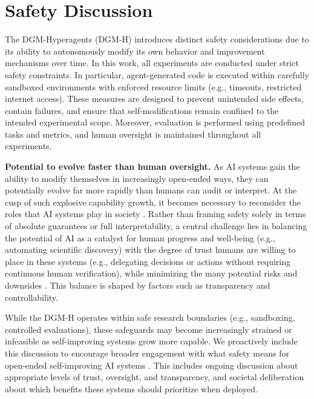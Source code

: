 \documentclass[]{fairmeta}
\begin{document}
\section{Safety Discussion}
\label{sec:safety}

The DGM-Hyperagents (DGM-H) introduces distinct safety considerations due to its ability to autonomously modify its own behavior and improvement mechanisms over time. In this work, all experiments are conducted under strict safety constraints. In particular, agent-generated code is executed within carefully sandboxed environments with enforced resource limits (e.g., timeouts, restricted internet access). These measures are designed to prevent unintended side effects, contain failures, and ensure that self-modifications remain confined to the intended experimental scope. Moreover, evaluation is performed using predefined tasks and metrics, and human oversight is maintained throughout all experiments.

\textbf{Potential to evolve faster than human oversight.}
As AI systems gain the ability to modify themselves in increasingly open-ended ways, they can potentially evolve far more rapidly than humans can audit or interpret. At the cusp of such explosive capability growth, it becomes necessary to reconsider the roles that AI systems play in society \citep{bengio2024managing}. Rather than framing safety solely in terms of absolute guarantees or full interpretability, a central challenge lies in balancing the potential of AI as a catalyst for human progress and well-being (e.g., automating scientific discovery) with the degree of trust humans are willing to place in these systems (e.g., delegating decisions or actions without requiring continuous human verification), while minimizing the many potential risks and downsides \citep{clune2019ai, ecoffet2020open, bengio2024managing, weston2025ai}. This balance is shaped by factors such as transparency and controllability.

While the DGM-H operates within safe research boundaries (e.g., sandboxing, controlled evaluations), these safeguards may become increasingly strained or infeasible as self-improving systems grow more capable. We proactively include this discussion to encourage broader engagement with what safety means for open-ended self-improving AI systems \citep{clune2019ai, ecoffet2020open, sheth2025safety}. This includes ongoing discussion about appropriate levels of trust, oversight, and transparency, and societal deliberation about which benefits these systems should prioritize when deployed.
\end{document}
